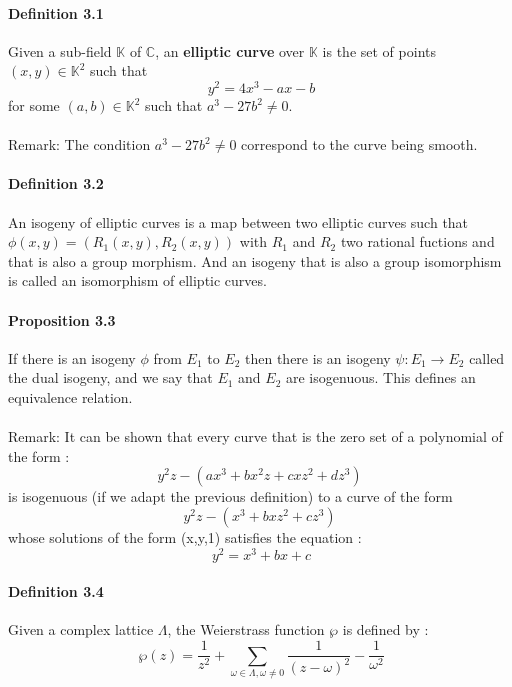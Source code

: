 \documentclass[letterpaper,10pt]{article}
\begin{document}
\paragraph{Definition 3.1} Given a sub-field $\mathbb{K}$ of $\mathbb{C}$, an \textbf{elliptic curve} over $\mathbb{K}$ is the set of points $(x,y) \in \mathbb{K}^2$ such that 
\[\ y^2 = 4x^3 - ax - b \] for some $(a,b) \in \mathbb{K}^2$ such that $a^3-27b^2 \neq 0$.
{\itshape \paragraph{} Remark: The condition $a^3-27b^2 \neq 0$ correspond to the curve being smooth.
}

\paragraph{Definition 3.2} An isogeny of elliptic curves is a map  between two elliptic curves such that $ \phi(x,y) = (R_1(x,y),R_2(x,y))$ 
with $R_1$ and $R_2$ two rational fuctions and that is also a group morphism. And an isogeny that is also a group isomorphism is called an isomorphism of
elliptic curves.

\paragraph{Proposition 3.3} If there is an isogeny $\phi$ from $E_1$ to $E_2$ then there is an isogeny
$\psi : E_1 \to E_2$ called the dual isogeny, and we say that $E_1$ and $E_2$ are isogenuous.
This defines an equivalence relation.

{\itshape \paragraph{}Remark: It can be shown that every curve that is the zero set of a polynomial of the form : 
\[ y^2z - (ax^3+bx^2z+ cxz^2 + dz^3)\]
is isogenuous (if we adapt the previous definition) to a curve of the form \[ y^2z - (x^3+bxz^2 + cz^3)\]
whose solutions of the form (x,y,1) satisfies the equation : \[\ y^2 = x^3 + bx + c \]

}



\paragraph{Definition 3.4} Given a complex lattice $\Lambda$, the Weierstrass function $\wp$ is defined by : 
\[\ \wp(z) = \frac{1}{z^2} +  \sum_{\omega \in \Lambda , \omega \neq 0 }\frac{1}{(z - \omega)^2} - \frac{1}{\omega^2} \]
\end{document}
